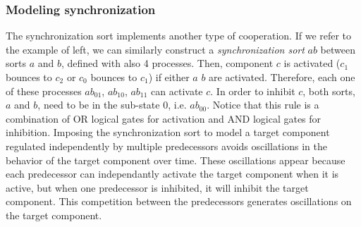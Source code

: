 \subsubsection{Modeling synchronization}
\label{sssec:synchronization}
The synchronization sort implements another type of cooperation. If we refer to the example of
 left, we can similarly construct a \emph{synchronization sort} $ab$ between sorts $a$ and $b$, defined with also 
4 processes. Then, component $c$ is activated ($c_1$ bounces to $c_2$ or $c_0$ bounces to $c_1$) if either  $a$  $b$ are activated. Therefore, each one of 
these processes $ab_{01}$, $ab_{10}$, $ab_{11}$ can activate $c$.  In order to inhibit $c$, both sorts, $a$ and $b$, need to be 
in the sub-state $0$, i.e. $ab_{00}$. Notice that this rule is a combination of OR logical gates for activation and AND logical gates for inhibition.
Imposing the synchronization sort to model a target component regulated independently by multiple predecessors avoids oscillations in the behavior of the target component over time. 
These oscillations appear because each predecessor can independantly activate the target component when it is active,
but when one predecessor is inhibited, it will inhibit the target component. This competition between the predecessors
generates oscillations on the target component.  




